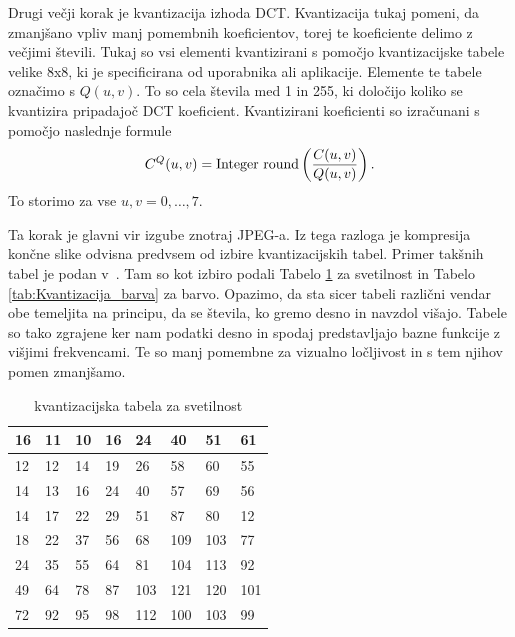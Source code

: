 \documentclass[a4paper,12pt,openright]{book}
\begin{document}
Drugi večji korak je kvantizacija izhoda DCT. Kvantizacija tukaj pomeni, da zmanjšano vpliv manj pomembnih koeficientov, torej te koeficiente delimo z večjimi števili. Tukaj so vsi elementi kvantizirani s pomočjo kvantizacijske tabele velike 8x8, ki je specificirana od uporabnika ali aplikacije. Elemente te tabele označimo s $Q(u,v)$. To so cela števila med 1 in 255, ki določijo koliko se kvantizira pripadajoč DCT koeficient. Kvantizirani koeficienti so izračunani s pomočjo naslednje formule
\begin{equation}
C^Q(u,v) = \hbox{Integer round} \left(\frac{C(u,v)}{Q(u,v)} \right).
\label{eq:kvantizacija}
\end{equation}
To storimo za vse $u,v = 0,\ldots,7$.\par
Ta korak je glavni vir izgube znotraj JPEG-a. Iz tega razloga je kompresija končne slike odvisna predvsem od izbire kvantizacijskih tabel. Primer takšnih tabel je podan v~\cite{ISO/IEC_10918-1}. Tam so kot izbiro podali Tabelo \ref{tab:Kvantizacija_svetilnost} za svetilnost in Tabelo \ref{tab:Kvantizacija_barva} za barvo. Opazimo, da sta sicer tabeli različni vendar obe temeljita na principu, da se števila, ko gremo desno in navzdol višajo. Tabele so tako zgrajene ker nam podatki desno in spodaj predstavljajo bazne funkcije z višjimi frekvencami. Te so manj pomembne za vizualno ločljivost in s tem njihov pomen zmanjšamo.
\begin{table}[ht]
\centering
\begin{tabular}{|p{18pt}|p{18pt}|p{18pt}|p{18pt}|p{18pt}|p{18pt}|p{18pt}|p{18pt}|}
\hline
16& 11& 10& 16&  24&  40&  51& 61\\  \hline
12& 12& 14& 19&  26&  58&  60& 55\\  \hline
14& 13& 16& 24&  40&  57&  69& 56\\  \hline
14& 17& 22& 29&  51&  87&  80& 12\\  \hline
18& 22& 37& 56&  68& 109& 103& 77\\  \hline
24& 35& 55& 64&  81& 104& 113& 92\\  \hline
49& 64& 78& 87& 103& 121& 120& 101\\ \hline
72& 92& 95& 98& 112& 100& 103& 99\\  \hline

\end{tabular}
\caption{kvantizacijska tabela za svetilnost}
\label{tab:Kvantizacija_svetilnost}
\end{table}
\end{document}
